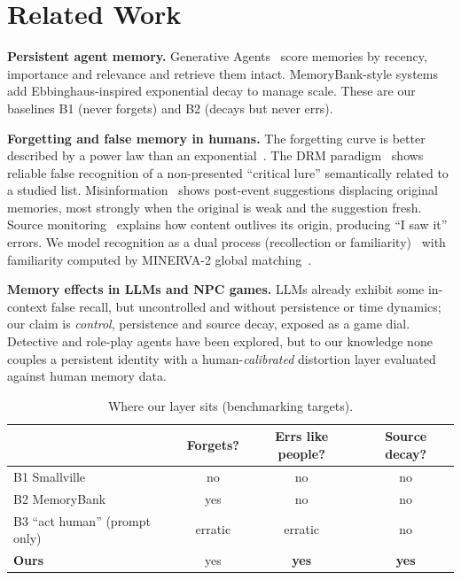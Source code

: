 \documentclass[conference]{IEEEtran}
\begin{document}
\section{Related Work}
\textbf{Persistent agent memory.} Generative Agents~\cite{park2023} score memories
by recency, importance and relevance and retrieve them intact. MemoryBank-style
systems~\cite{memorybank} add Ebbinghaus-inspired exponential decay to manage
scale. These are our baselines B1 (never forgets) and B2 (decays but never errs).

\textbf{Forgetting and false memory in humans.} The forgetting curve is better
described by a power law than an exponential~\cite{wixted1991,murre2015}. The DRM
paradigm~\cite{roediger1995} shows reliable false recognition of a
non-presented ``critical lure'' semantically related to a studied list.
Misinformation~\cite{loftus1978} shows post-event suggestions displacing original
memories, most strongly when the original is weak and the suggestion fresh.
Source monitoring~\cite{johnson1993} explains how content outlives its origin,
producing ``I saw it'' errors. We model recognition as a dual process
(recollection or familiarity)~\cite{yonelinas2002} with familiarity computed by
MINERVA-2 global matching~\cite{hintzman1988}.

\textbf{Memory effects in LLMs and NPC games.} LLMs already exhibit some in-context
false recall, but uncontrolled and without persistence or time dynamics; our claim
is \emph{control}, persistence and source decay, exposed as a game dial. Detective
and role-play agents have been explored, but to our knowledge none couples a
persistent identity with a human-\emph{calibrated} distortion layer evaluated
against human memory data.

\begin{table}[t]
\caption{Where our layer sits (benchmarking targets).}
\label{tab:matrix}
\centering\small
\begin{tabular}{@{}lccc@{}}
\toprule
 & Forgets? & Errs like people? & Source decay? \\
\midrule
B1 Smallville~\cite{park2023}      & no  & no  & no \\
B2 MemoryBank~\cite{memorybank}    & yes & no  & no \\
B3 ``act human'' (prompt only)     & erratic & erratic & no \\
\textbf{Ours}                      & yes & \textbf{yes} & \textbf{yes} \\
\bottomrule
\end{tabular}
\end{table}
\end{document}
